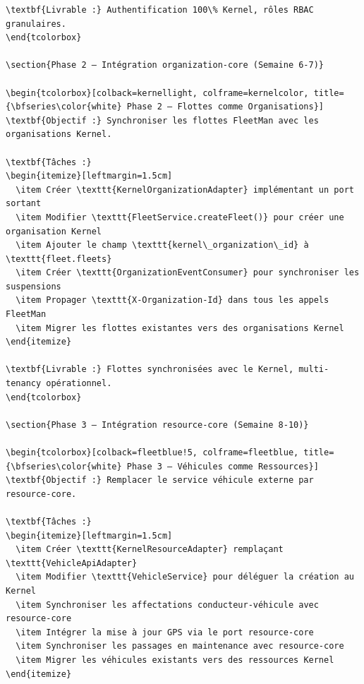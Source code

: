 \documentclass[12pt,a4paper]{report}
\begin{document}
\begin{lstlisting}[style=javaStyle, caption={Handler d'erreurs Kernel dans GlobalExceptionHandler}]
\textbf{Livrable :} Authentification 100\% Kernel, rôles RBAC granulaires.
\end{tcolorbox}

\section{Phase 2 — Intégration organization-core (Semaine 6-7)}

\begin{tcolorbox}[colback=kernellight, colframe=kernelcolor, title={\bfseries\color{white} Phase 2 — Flottes comme Organisations}]
\textbf{Objectif :} Synchroniser les flottes FleetMan avec les organisations Kernel.

\textbf{Tâches :}
\begin{itemize}[leftmargin=1.5cm]
  \item Créer \texttt{KernelOrganizationAdapter} implémentant un port sortant
  \item Modifier \texttt{FleetService.createFleet()} pour créer une organisation Kernel
  \item Ajouter le champ \texttt{kernel\_organization\_id} à \texttt{fleet.fleets}
  \item Créer \texttt{OrganizationEventConsumer} pour synchroniser les suspensions
  \item Propager \texttt{X-Organization-Id} dans tous les appels FleetMan
  \item Migrer les flottes existantes vers des organisations Kernel
\end{itemize}

\textbf{Livrable :} Flottes synchronisées avec le Kernel, multi-tenancy opérationnel.
\end{tcolorbox}

\section{Phase 3 — Intégration resource-core (Semaine 8-10)}

\begin{tcolorbox}[colback=fleetblue!5, colframe=fleetblue, title={\bfseries\color{white} Phase 3 — Véhicules comme Ressources}]
\textbf{Objectif :} Remplacer le service véhicule externe par resource-core.

\textbf{Tâches :}
\begin{itemize}[leftmargin=1.5cm]
  \item Créer \texttt{KernelResourceAdapter} remplaçant \texttt{VehicleApiAdapter}
  \item Modifier \texttt{VehicleService} pour déléguer la création au Kernel
  \item Synchroniser les affectations conducteur-véhicule avec resource-core
  \item Intégrer la mise à jour GPS via le port resource-core
  \item Synchroniser les passages en maintenance avec resource-core
  \item Migrer les véhicules existants vers des ressources Kernel
\end{itemize}


\end{lstlisting}
\end{document}
